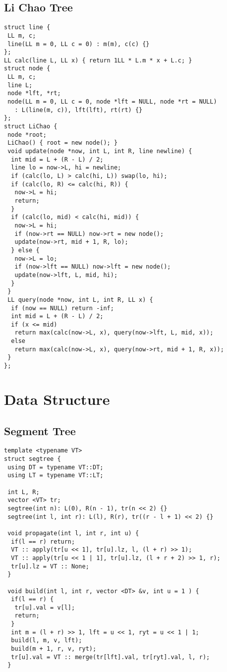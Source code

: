 \documentclass[a4paper,11pt,oneside]{article}
\begin{document}
\begin{multicols*}{\COLS}
\subsection{Li Chao Tree}
\begin{lstlisting}
struct line {
 LL m, c;
 line(LL m = 0, LL c = 0) : m(m), c(c) {}
};
LL calc(line L, LL x) { return 1LL * L.m * x + L.c; }
struct node {
 LL m, c;
 line L;
 node *lft, *rt;
 node(LL m = 0, LL c = 0, node *lft = NULL, node *rt = NULL)
   : L(line(m, c)), lft(lft), rt(rt) {}
};
struct LiChao {
 node *root;
 LiChao() { root = new node(); }
 void update(node *now, int L, int R, line newline) {
  int mid = L + (R - L) / 2;
  line lo = now->L, hi = newline;
  if (calc(lo, L) > calc(hi, L)) swap(lo, hi);
  if (calc(lo, R) <= calc(hi, R)) {
   now->L = hi;
   return;
  }
  if (calc(lo, mid) < calc(hi, mid)) {
   now->L = hi;
   if (now->rt == NULL) now->rt = new node();
   update(now->rt, mid + 1, R, lo);
  } else {
   now->L = lo;
   if (now->lft == NULL) now->lft = new node();
   update(now->lft, L, mid, hi);
  }
 }
 LL query(node *now, int L, int R, LL x) {
  if (now == NULL) return -inf;
  int mid = L + (R - L) / 2;
  if (x <= mid)
   return max(calc(now->L, x), query(now->lft, L, mid, x));
  else
   return max(calc(now->L, x), query(now->rt, mid + 1, R, x));
 }
};
\end{lstlisting}
\section{Data Structure}
\subsection{Segment Tree}
\begin{lstlisting}
template <typename VT>
struct segtree {
 using DT = typename VT::DT;
 using LT = typename VT::LT;

 int L, R;
 vector <VT> tr;
 segtree(int n): L(0), R(n - 1), tr(n << 2) {}
 segtree(int l, int r): L(l), R(r), tr((r - l + 1) << 2) {}

 void propagate(int l, int r, int u) {
  if(l == r) return;
  VT :: apply(tr[u << 1], tr[u].lz, l, (l + r) >> 1);
  VT :: apply(tr[u << 1 | 1], tr[u].lz, (l + r + 2) >> 1, r);
  tr[u].lz = VT :: None;
 }

 void build(int l, int r, vector <DT> &v, int u = 1 ) {
  if(l == r) {
   tr[u].val = v[l];
   return;
  }
  int m = (l + r) >> 1, lft = u << 1, ryt = u << 1 | 1;
  build(l, m, v, lft);
  build(m + 1, r, v, ryt);
  tr[u].val = VT :: merge(tr[lft].val, tr[ryt].val, l, r);
 }


\end{lstlisting}
\end{multicols*}
\end{document}
